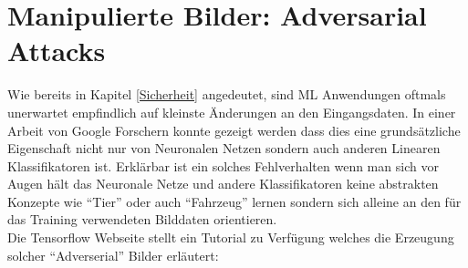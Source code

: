 \documentclass[
  12pt, %
  a4paper, %
  oneside, %
  openany, 
  numbers=noenddot, %
  BCOR=5mm, %
  parskip=half*, %
  thesis, %
]{bfhbook}
\begin{document}
\section{Manipulierte Bilder: Adversarial Attacks}
Wie bereits in Kapitel \ref{Sicherheit} angedeutet, sind \Gls{ML} Anwendungen oftmals unerwartet empfindlich auf kleinste Änderungen an den Eingangsdaten. In einer Arbeit von Google Forschern   \parencite{Goodfellow2014} konnte gezeigt werden dass dies eine grundsätzliche Eigenschaft nicht nur von Neuronalen Netzen sondern auch anderen Linearen Klassifikatoren ist. Erklärbar ist ein solches Fehlverhalten wenn man sich vor Augen hält das Neuronale Netze und andere Klassifikatoren keine abstrakten Konzepte wie ``Tier'' oder auch ``Fahrzeug'' lernen sondern sich alleine an den für das Training verwendeten Bilddaten orientieren.\\
Die Tensorflow Webseite stellt ein Tutorial zu Verfügung welches die Erzeugung solcher ``Adverserial'' Bilder erläutert: \parencite{tensorflowFGSM}
\end{document}
